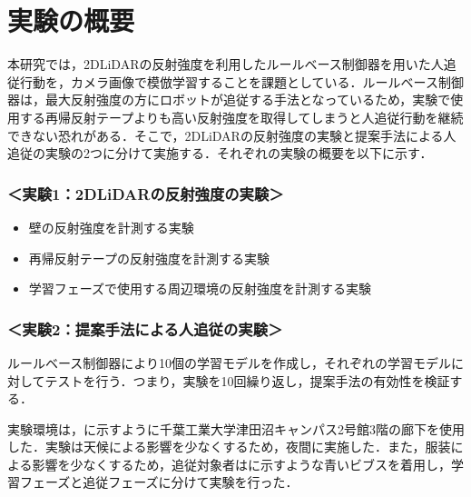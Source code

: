 
\section{実験の概要}

  本研究では，2DLiDARの反射強度を利用したルールベース制御器を用いた人追従行動を，カメラ画像で模倣学習することを課題としている．ルールベース制御器は，最大反射強度の方にロボットが追従する手法となっているため，実験で使用する再帰反射テープよりも高い反射強度を取得してしまうと人追従行動を継続できない恐れがある．そこで，2DLiDARの反射強度の実験と提案手法による人追従の実験の2つに分けて実施する．それぞれの実験の概要を以下に示す．

  \subsubsection*{＜実験1：2DLiDARの反射強度の実験＞}
  \begin{itemize}
    \item 壁の反射強度を計測する実験
    \item 再帰反射テープの反射強度を計測する実験
    \item 学習フェーズで使用する周辺環境の反射強度を計測する実験
  \end{itemize}
  
\newpage

  \subsubsection*{＜実験2：提案手法による人追従の実験＞}
  ルールベース制御器により10個の学習モデルを作成し，それぞれの学習モデルに対してテストを行う．つまり，実験を10回繰り返し，提案手法の有効性を検証する．

  \vspace{1cm}

  実験環境は，に示すように千葉工業大学津田沼キャンパス2号館3階の廊下を使用した．実験は天候による影響を少なくするため，夜間に実施した．また，服装による影響を少なくするため，追従対象者はに示すような青いビブスを着用し，学習フェーズと追従フェーズに分けて実験を行った．

